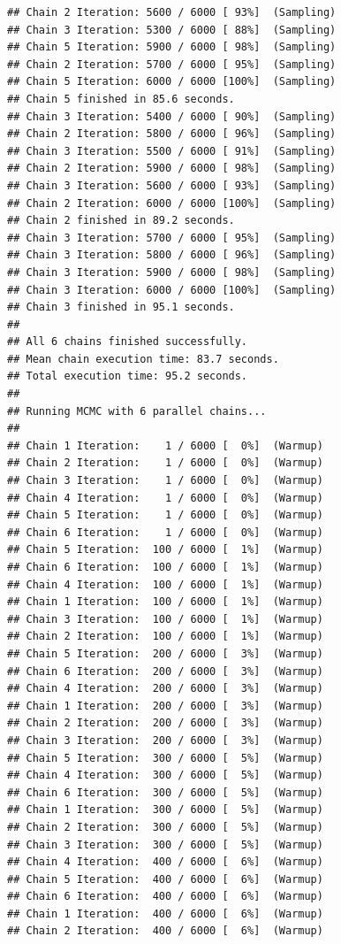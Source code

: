 \documentclass[
]{article}
\begin{document}
\begin{verbatim}
## Chain 2 Iteration: 5600 / 6000 [ 93%]  (Sampling) 
## Chain 3 Iteration: 5300 / 6000 [ 88%]  (Sampling) 
## Chain 5 Iteration: 5900 / 6000 [ 98%]  (Sampling) 
## Chain 2 Iteration: 5700 / 6000 [ 95%]  (Sampling) 
## Chain 5 Iteration: 6000 / 6000 [100%]  (Sampling) 
## Chain 5 finished in 85.6 seconds.
## Chain 3 Iteration: 5400 / 6000 [ 90%]  (Sampling) 
## Chain 2 Iteration: 5800 / 6000 [ 96%]  (Sampling) 
## Chain 3 Iteration: 5500 / 6000 [ 91%]  (Sampling) 
## Chain 2 Iteration: 5900 / 6000 [ 98%]  (Sampling) 
## Chain 3 Iteration: 5600 / 6000 [ 93%]  (Sampling) 
## Chain 2 Iteration: 6000 / 6000 [100%]  (Sampling) 
## Chain 2 finished in 89.2 seconds.
## Chain 3 Iteration: 5700 / 6000 [ 95%]  (Sampling) 
## Chain 3 Iteration: 5800 / 6000 [ 96%]  (Sampling) 
## Chain 3 Iteration: 5900 / 6000 [ 98%]  (Sampling) 
## Chain 3 Iteration: 6000 / 6000 [100%]  (Sampling) 
## Chain 3 finished in 95.1 seconds.
## 
## All 6 chains finished successfully.
## Mean chain execution time: 83.7 seconds.
## Total execution time: 95.2 seconds.
## 
## Running MCMC with 6 parallel chains...
## 
## Chain 1 Iteration:    1 / 6000 [  0%]  (Warmup) 
## Chain 2 Iteration:    1 / 6000 [  0%]  (Warmup) 
## Chain 3 Iteration:    1 / 6000 [  0%]  (Warmup) 
## Chain 4 Iteration:    1 / 6000 [  0%]  (Warmup) 
## Chain 5 Iteration:    1 / 6000 [  0%]  (Warmup) 
## Chain 6 Iteration:    1 / 6000 [  0%]  (Warmup) 
## Chain 5 Iteration:  100 / 6000 [  1%]  (Warmup) 
## Chain 6 Iteration:  100 / 6000 [  1%]  (Warmup) 
## Chain 4 Iteration:  100 / 6000 [  1%]  (Warmup) 
## Chain 1 Iteration:  100 / 6000 [  1%]  (Warmup) 
## Chain 3 Iteration:  100 / 6000 [  1%]  (Warmup) 
## Chain 2 Iteration:  100 / 6000 [  1%]  (Warmup) 
## Chain 5 Iteration:  200 / 6000 [  3%]  (Warmup) 
## Chain 6 Iteration:  200 / 6000 [  3%]  (Warmup) 
## Chain 4 Iteration:  200 / 6000 [  3%]  (Warmup) 
## Chain 1 Iteration:  200 / 6000 [  3%]  (Warmup) 
## Chain 2 Iteration:  200 / 6000 [  3%]  (Warmup) 
## Chain 3 Iteration:  200 / 6000 [  3%]  (Warmup) 
## Chain 5 Iteration:  300 / 6000 [  5%]  (Warmup) 
## Chain 4 Iteration:  300 / 6000 [  5%]  (Warmup) 
## Chain 6 Iteration:  300 / 6000 [  5%]  (Warmup) 
## Chain 1 Iteration:  300 / 6000 [  5%]  (Warmup) 
## Chain 2 Iteration:  300 / 6000 [  5%]  (Warmup) 
## Chain 3 Iteration:  300 / 6000 [  5%]  (Warmup) 
## Chain 4 Iteration:  400 / 6000 [  6%]  (Warmup) 
## Chain 5 Iteration:  400 / 6000 [  6%]  (Warmup) 
## Chain 6 Iteration:  400 / 6000 [  6%]  (Warmup) 
## Chain 1 Iteration:  400 / 6000 [  6%]  (Warmup) 
## Chain 2 Iteration:  400 / 6000 [  6%]  (Warmup) 

\end{verbatim}
\end{document}
